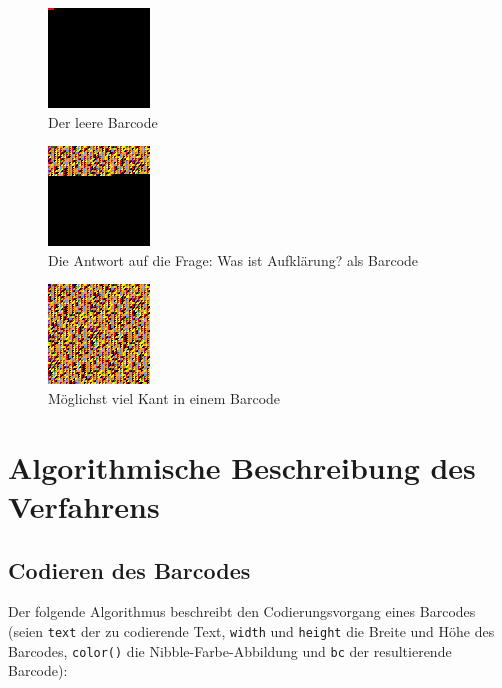\documentclass[11pt]{scrreprt} %
\theoremstyle{definition}
\begin{document}
\begin{enumerate}
\begin{figure}
\caption{Der leere Barcode}
\label{test:leer}
\begin{center}
\includegraphics[scale=1.4]{../leer.png}
\end{center}
\end{figure}
\begin{figure}
\caption{Die Antwort auf die Frage: Was ist Aufklärung? als Barcode}
\label{test:kant}
\begin{center}
\includegraphics[scale=1.4]{../kant.png}
\end{center}
\end{figure}
\begin{figure}
\caption{Möglichst viel Kant in einem Barcode}
\label{test:kantkant}
\begin{center}
\includegraphics[scale=1.4]{../kantkant.png}
\end{center}
\end{figure}


\end{enumerate}

\chapter{Algorithmische Beschreibung des Verfahrens}

\section{Codieren des Barcodes}

Der folgende Algorithmus beschreibt den Codierungsvorgang eines Barcodes (seien {\tt text} der zu codierende Text, {\tt width} und {\tt height} die Breite und Höhe des Barcodes, {\tt color()} die Nibble-Farbe-Abbildung und {\tt bc} der resultierende Barcode):
\end{document}
